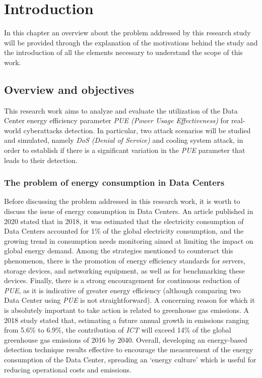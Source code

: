 \chapter{Introduction} \label{chapter:introduction}

\begin{citazione}
In this chapter an overview about the problem addressed by this research study will be provided through the explanation of the motivations behind the study and the introduction of all the elements necessary to understand the scope of this work.
\end{citazione}
\newpage


\section{Overview and objectives} 
This research work aims to analyze and evaluate the utilization of the Data Center energy efficiency parameter \emph{PUE (Power Usage Effectiveness)} for real-world cyberattacks detection. In particular, two attack scenarios will be studied and simulated, namely \emph{DoS (Denial of Service)} and cooling system attack, in order to establish if there is a significant variation in the \emph{PUE} parameter that leads to their detection. 

\subsection{The problem of energy consumption in Data Centers}
Before discussing the problem addressed in this research work, it is worth to discuss the issue of energy consumption in Data Centers. An article published in 2020 \cite{masanet2020recalibrating} stated that in 2018, it was estimated that the electricity consumption of Data Centers accounted for 1\% of the global electricity consumption, and the growing trend in consumption needs monitoring aimed at limiting the impact on global energy demand. Among the strategies mentioned to counteract this phenomenon, there is the promotion of energy efficiency standards for servers, storage devices, and networking equipment, as well as for benchmarking these devices. Finally, there is a strong encouragement for continuous reduction of \emph{PUE}, as it is indicative of greater energy efficiency (although comparing two Data Center using \emph{PUE} is not straightforward). A concerning reason for which it is absolutely important to take action is related to greenhouse gas emissions. A 2018 study \cite{belkhir2018assessing} stated that, estimating a future annual growth in emissions ranging from 5.6\% to 6.9\%, the contribution of \emph{ICT} will exceed 14\% of the global greenhouse gas emissions of 2016 by 2040. Overall, developing an energy-based detection technique results effective to encourage the measurement of the energy consumption of the Data Center, spreading an `energy culture' which is useful for reducing operational costs and emissions.



